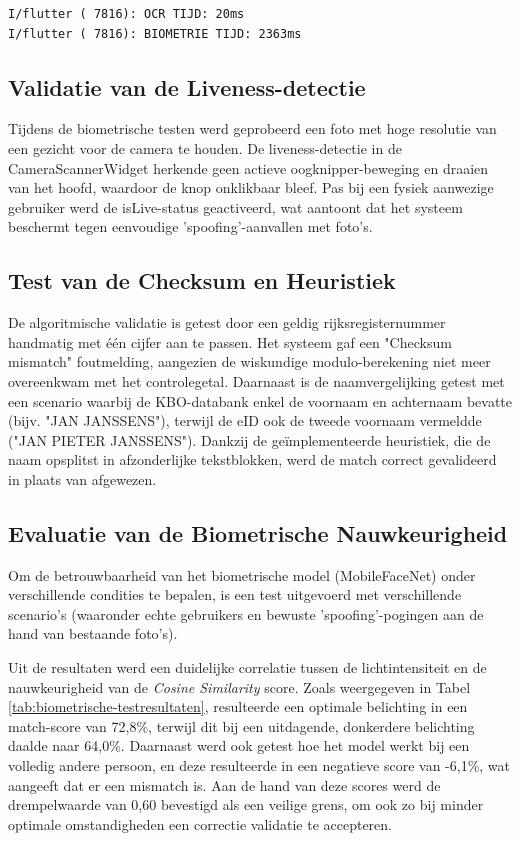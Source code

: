 \begin{itemize}
\begin{lstlisting}[style=consoleStyle, caption={Console-output van OCR en biometrische verificatie in Flutter}, label={lst:flutter_kyc_results}]
I/flutter ( 7816): OCR TIJD: 20ms
I/flutter ( 7816): BIOMETRIE TIJD: 2363ms
\end{lstlisting}

\subsection{Validatie van de Liveness-detectie}
Tijdens de biometrische testen werd geprobeerd een foto met hoge resolutie van een gezicht voor de camera te houden. De liveness-detectie in de CameraScannerWidget herkende geen actieve oogknipper-beweging en draaien van het hoofd, 
waardoor de knop onklikbaar bleef. Pas bij een fysiek aanwezige gebruiker werd de isLive-status geactiveerd, wat aantoont dat het systeem beschermt tegen eenvoudige 'spoofing'-aanvallen met foto's.

\subsection{Test van de Checksum en Heuristiek}
De algoritmische validatie is getest door een geldig rijksregisternummer handmatig met één cijfer aan te passen. 
Het systeem gaf een "Checksum mismatch" foutmelding, aangezien de wiskundige modulo-berekening niet meer overeenkwam met het controlegetal. 
Daarnaast is de naamvergelijking getest met een scenario waarbij de KBO-databank enkel de voornaam en achternaam bevatte (bijv. "JAN JANSSENS"), 
terwijl de eID ook de tweede voornaam vermeldde ("JAN PIETER JANSSENS"). Dankzij de geïmplementeerde heuristiek, die de naam opsplitst in afzonderlijke tekstblokken, werd de match correct gevalideerd in plaats van afgewezen. 

\subsection{Evaluatie van de Biometrische Nauwkeurigheid}
Om de betrouwbaarheid van het biometrische model (MobileFaceNet) onder verschillende condities te bepalen, is een test uitgevoerd met verschillende scenario's (waaronder echte gebruikers en bewuste 'spoofing'-pogingen aan de hand van bestaande foto's). 

Uit de resultaten werd een duidelijke correlatie tussen de lichtintensiteit en de nauwkeurigheid van de \textit{Cosine Similarity} score. 
Zoals weergegeven in Tabel \ref{tab:biometrische-testresultaten}, resulteerde een optimale belichting in een match-score van 72,8\%, terwijl dit bij een uitdagende, donkerdere belichting daalde naar 64,0\%. 
Daarnaast werd ook getest hoe het model werkt bij een volledig andere persoon, en deze resulteerde in een negatieve score van -6,1\%, wat aangeeft dat er een mismatch is.
Aan de hand van deze scores werd de drempelwaarde van 0,60 bevestigd als een veilige grens, om ook zo bij minder optimale omstandigheden een correctie validatie te accepteren.


\end{itemize}
